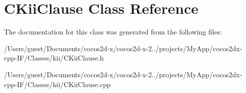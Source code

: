 \hypertarget{class_c_kii_clause}{\section{C\-Kii\-Clause Class Reference}
\label{class_c_kii_clause}
}


The documentation for this class was generated from the following files\-:\begin{DoxyCompactItemize}
\item 
/\-Users/guest/\-Documents/cocos2d-\/x/cocos2d-\/x-\/2../projects/\-My\-App/cocos2dx-\/cpp-\/\-I\-F/\-Classes/kii/C\-Kii\-Clause.\-h\item 
/\-Users/guest/\-Documents/cocos2d-\/x/cocos2d-\/x-\/2../projects/\-My\-App/cocos2dx-\/cpp-\/\-I\-F/\-Classes/kii/C\-Kii\-Clause.\-cpp\end{DoxyCompactItemize}
